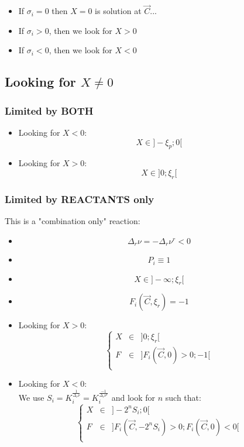 \documentclass[aps,12pt]{revtex4}
\begin{document}
\begin{itemize}
\item If $\sigma_i=0$ then $X=0$ is solution at $\vec{C}$...

\item If $\sigma_i>0$, then we look for $X>0$

\item If $\sigma_i<0$, then we look for $X<0$

\end{itemize}

\subsection{Looking for $X\not=0$}
	
\subsubsection{Limited by BOTH}

\begin{itemize}
\item Looking for $X<0$:
$$
X \in \rbrack -\xi_p; 0 \lbrack
$$
\item Looking for $X>0$:
$$
X \in \rbrack 0; \xi_r \lbrack
$$
\end{itemize}

\subsubsection{Limited by REACTANTS only}
This is a "combination only" reaction:
\begin{itemize}
\item
$$
	\Delta_r \nu = - \Delta_r \nu^r < 0 
$$
\item $$P_i \equiv 1$$
\item $$X \in \rbrack -\infty; \xi_r \lbrack$$
\item $$F_i(\vec{C},\xi_r)=-1$$
\item Looking for $X>0$:
 $$
 \left\lbrace
 \begin{array}{rcl}
 	X &\in& \rbrack 0;\xi_r \lbrack\\
	F &\in& \rbrack F_i(\vec{C},0)>0 ; -1 \lbrack\\
\end{array}
\right.
 $$
 \item Looking for $X<0$:\\
 We use $S_i=K_i^{\frac{1}{\Delta_r \nu}}=K_i^{\frac{-1}{\Delta_r \nu^r}}$
 and look for $n$ such that:
 $$
 	\left\lbrace
 \begin{array}{rcl}
 	X &\in& \rbrack -2^n S_i;0 \lbrack\\
	F &\in& \rbrack F_i(\vec{C},-2^nS_i)>0 ; F_i(\vec{C},0)<0 \lbrack\\
\end{array}
\right.
 $$
\end{itemize}
 	
\end{document}
